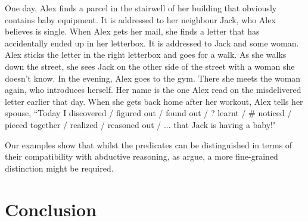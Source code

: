 \documentclass[11pt,fleqn]{article}
\newcommand{\6}{\mbox{$[\hspace*{-.6mm}[$}}
\newcommand{\9}{\mbox{$]\hspace*{-.6mm}]$}}
\begin{document}
\begin{exe}
	\ex One day, Alex finds a parcel in the stairwell of her building that obviously contains baby equipment. It is addressed to her neighbour Jack, who Alex believes is single. When Alex gets her mail, she finds a letter that has accidentally ended up in her letterbox. It is addressed to Jack and some woman. Alex sticks the letter in the right letterbox and goes for a walk. As she walks down the street, she sees Jack on the other side of the street with a woman she doesn't know. In the evening, Alex goes to the gym. There she meets the woman again, who introduces herself. Her name is the one Alex read on the misdelivered letter earlier that day. When she gets back home after her workout, Alex tells her spouse, ``Today I discovered / figured out / found out / ? learnt / \# noticed / pieced together / realized / reasoned out / ... that Jack is having a baby!"
\end{exe}

Our examples show that whilst the predicates can be distinguished in terms of their compatibility with abductive reasoning, as \cite{korotkova-anand-dgfs2024} argue, a more fine-grained distinction might be required.

\section{Conclusion}





\end{document}
